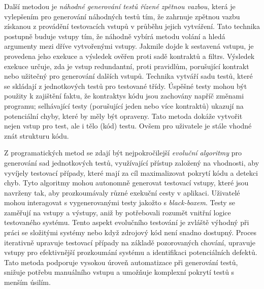 \documentclass[czech, ma, kiv, he, iso690alph, pdf, viewonly]{fasthesis}
\begin{document}
        Další metodou je \textit{náhodné generování testů řízené zpětnou vazbou}, která je vylepšením pro generování náhodných testů tím, že zahrnuje zpětnou vazbu získanou z provádění testovacích vstupů v průběhu jejich vytváření. Tato technika postupně buduje vstupy tím, že náhodně vybírá metodu volání a hledá argumenty mezi dříve vytvořenými vstupy. Jakmile dojde k sestavená vstupu, je provedena jeho exekuce a výsledek ověřen proti sadě \gls{kontrakt}ů a \glspl{filtr}. Výsledek exekuce určuje, zda je vstup redundantní, proti pravidlům, porušující \gls{kontrakt} nebo užitečný pro generování dalších vstupů. Technika vytváří sadu testů, které se skládají z jednotkových testů pro testované třídy. Úspěšné testy mohou být použity k zajištění faktu, že \glspl{kontrakty} kódu jsou zachovány napříč změnami programu; selhávající testy (porušující jeden nebo více kontraktů) ukazují na potenciální chyby, které by měly být opraveny. Tato metoda dokáže vytvořit nejen vstup pro test, ale i tělo (kód) testu. Ovšem pro uživatele je stále vhodné znát strukturu kódu. \cite{FeedbackDirectedRT}

        Z programatických metod se zdají být nejpokročilejší \emph{evoluční algoritmy} pro generování sad jednotkových testů, využívající přístup založený na vhodnosti, aby vyvíjely testovací případy, které mají za cíl maximalizovat pokrytí kódu a detekci chyb. Tyto algoritmy mohou autonomně generovat testovací vstupy, které jsou navrženy tak, aby prozkoumávaly různé exekuční cesty v aplikaci. Uživatelé mohou interagovat s vygenerovanými testy jakožto s \textit{black-boxem}. Testy se zaměřují na vstupy a výstupy, aniž by potřebovali rozumět vnitřní logice testovaného systému. Tento aspekt evolučního testování je zvláště výhodný při práci se složitými systémy nebo když zdrojový kód není snadno dostupný. Proces iterativně upravuje testovací případy na základě pozorovaných chování, upravuje vstupy pro efektivnější prozkoumání systému a identifikaci potenciálních defektů. Tato metoda podporuje vysokou úroveň automatizace při generování testů, snižuje potřebu manuálního vstupu a umožňuje komplexní pokrytí testů s menším úsilím. \cite{CAMPOS2018207} \cite{abs-2111-05003}
\end{document}
